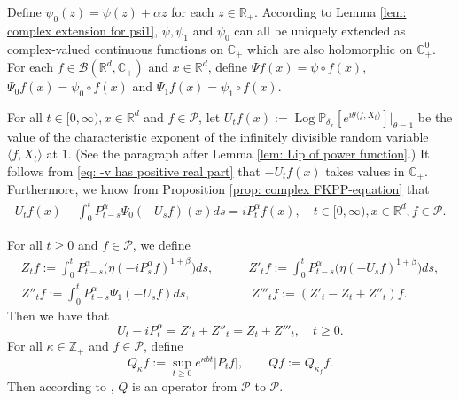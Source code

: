\documentclass[12pt,a4paper]{amsart}
\theoremstyle{plain}
\theoremstyle{definition}
\numberwithin{equation}{section}
\begin{document}
Define $\psi_0(z) = \psi(z) + \alpha z$ for each $z\in \mathbb{R}_+$.
According to Lemma \ref{lem: complex extension for psi1}, $\psi, \psi_1$ and $\psi_0$ can all be uniquely extended as complex-valued continuous functions on $\mathbb C_+$ which are also holomorphic on $\mathbb C^0_+$.
For each $f\in \mathcal B(\mathbb R^d, \mathbb C_+)$ and $x\in \mathbb R^d$, define
$\Psi f (x) = \psi\circ f(x)$, $\Psi_0 f(x)= \psi_0 \circ f(x)$ and $\Psi_1 f(x)= \psi_1 \circ f(x)$.

For all $t\in [0,\infty), x\in \mathbb R^d $ and $f \in \mathcal{P}$, let
  \(
    U_tf(x)
  := \operatorname{Log} \mathbb P_{\delta_x}[e^{i\theta \langle f, X_t\rangle}]|_{\theta = 1}
\)
be the value of the characteristic exponent of the infinitely divisible random variable $\langle f, X_t\rangle$ at $1$.
(See the paragraph after Lemma \ref{lem: Lip of power function}.)
It follows from \eqref{eq: -v has positive real part} that $-U_tf(x)$ takes values in $\mathbb C_+$. Furthermore, we know from Proposition \ref{prop: complex FKPP-equation} that
\begin{align}
  \label{eq:chareq2}
  U_tf(x) - \int_0^t P^\alpha_{t-s} \Psi_0(-U_sf)(x)ds
  = i P^{\alpha}_t f(x)
  , \quad t\in [0,\infty), x\in \mathbb{R}^d, f\in \mathcal P.
\end{align}

For all $t\geq 0$ and $f\in \mathcal P$, we define
\begin{align}
  \label{eq: def of Zf}
  Z_t f
    := \int_0^t P^\alpha_{t-s}\big( \eta (-i P^\alpha_sf)^{1+\beta}\big)ds,
    & \qquad Z'_t f
    := \int_0^t P^\alpha_{t-s}\big( \eta (-U_s f)^{1+\beta}\big)ds,\\
   Z''_t f
    := \int_0^t P^\alpha_{t-s}\Psi_1(-U_s f)ds,
    &\qquad\  Z'''_t f
    := (Z'_t - Z_t+ Z''_t)f.
\end{align}
Then we have that
\begin{equation}
  \label{eq: key equality}
  U_t - i P^\alpha_t
  = Z'_t + Z''_t
  = Z_t + Z'''_t
  , \quad t\geq 0.
\end{equation}
For all $\kappa \in \mathbb Z_+$ and $f\in \mathcal P$, define
\begin{equation}
  \label{eq:Q}
  Q_\kappa f
  := \sup_{t\geq 0} e^{\kappa b t}|P_t f|,
  \qquad  Q f
  := Q_{\kappa_f}f.
\end{equation}
Then according to \cite[Fact 1.2]{MarksMilos2018CLT}, $Q$ is an operator from $\mathcal P$ to $\mathcal P$.
\end{document}
